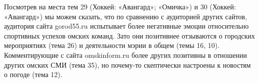 Посмотрев на места тем 29 (Хоккей: «Авангард»; «Омичка») и 30 (Хоккей: «Авангард») мы можем сказать, что по сравнению с аудиторией других сайтов, аудитория сайта gorod55.ru испытывает более негативные эмоции относительно спортивных успехов омских команд. Зато они позитивнее отзываются о городских мероприятиях (тема 26) и деятельности мэрии в общем (темы 16, 10). Комментирующие с сайта omskinform.ru более других позитивны в отношении других омских СМИ (тема 35), но почему-то скептически настроены к новостям о погоде (тема 12).


\clearpage